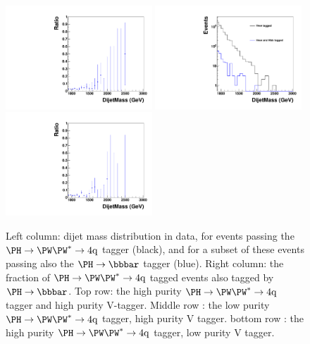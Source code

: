 \begin{figure}[ht]
\begin{center}
\includegraphics[width=0.49\textwidth, height=0.45\textwidth]{HqqqqZqqfigs/HbbHww/LowHPurityRatio.pdf}
\includegraphics[width=0.49\textwidth, height=0.45\textwidth]{HqqqqZqqfigs/HbbHww/LowVPurity.pdf}
\includegraphics[width=0.49\textwidth, height=0.45\textwidth]{HqqqqZqqfigs/HbbHww/LowVPurityRatio.pdf}
\end{center}
\caption{ 
  Left column: dijet mass distribution in data, for events passing the $\Hww$
  tagger (black), and for a subset of these events passing also 
  the $\Hbb$ tagger (blue).  Right column: the fraction of $\Hww$ tagged events
  also tagged by $\Hbb$.  Top row: the high purity $\Hww$ tagger 
  and high purity V-tagger.  
  Middle row : the low purity $\Hww$ tagger, high purity V tagger. 
  bottom row : the high purity $\Hww$ tagger, low purity V tagger. 
}
\label{fig:HbbRatio}
\end{figure}


\clearpage
